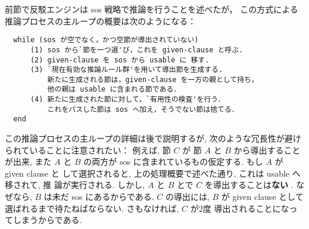 前節で反駁エンジンは sos 戦略で推論を行うことを述べたが，
この方式による推論プロセスの主ループの概要は次のようになる：

\begin{verbatim}
  while (sos が空でなく，かつ空節が導出されていない)
      (1) sos から`節を一つ選'び，これを given-clause と呼ぶ.
      (2) given-clause を sos から usable に 移す.
      (3) `現在有効な推論ルール群'を用いて導出節を生成する.
          新たに生成される節は，given-clause を一方の親として持ち，
          他の親は usable に含まれる節である．
      (4) 新たに生成された節に対して，`有用性の検査'を行う．
          これをパスした節は sos へ加え，そうでない節は捨てる．
  end 
\end{verbatim}



この推論プロセスの主ループの詳細は後で説明するが, 次のような冗長性が避け
られていることに注意されたい：
例えば, 節 $C$ が 節 $A$ と $B$ から導出することが出来, また $A$ と
$B$ の両方が sos に含まれているもの仮定する. もし $A$ が given clause と
して選択されると, 上の処理概要で述べた通り, これは usable へ移されて, 推
論が実行される. しかし, $A$ と $B$ とで $C$ を導出することは\textbf{ない
  }. なぜなら, $B$ は未だ sos にあるからである. $C$ の導出には, $B$ が
given clause として選ばれるまで待たねばならない. さもなければ, $C$ が2度
導出されることになってしまうからである.

